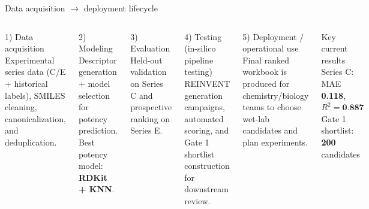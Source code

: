\documentclass[aspectratio=169,10pt]{beamer}
\begin{document}
\begin{frame}{Data acquisition \(\rightarrow\) deployment lifecycle}
  \small
  \begin{columns}[T]
      \begin{block}{1) Data acquisition}
        Experimental series data (C/E + historical labels), SMILES cleaning,
        canonicalization, and deduplication.
      \end{block}
      \begin{block}{2) Modeling}
        Descriptor generation + model selection for potency prediction.
        Best potency model: \textbf{RDKit + KNN}.
      \end{block}
      \begin{block}{3) Evaluation}
        Held-out validation on Series C and prospective ranking on Series E.
      \end{block}
      \begin{block}{4) Testing (in-silico pipeline testing)}
        REINVENT generation campaigns, automated scoring, and
        Gate 1 shortlist construction for downstream review.
      \end{block}
      \begin{block}{5) Deployment / operational use}
        Final ranked workbook is produced for chemistry/biology teams to
        choose wet-lab candidates and plan experiments.
      \end{block}
      \begin{exampleblock}{Key current results}
        Series C: MAE \textbf{0.118}, \(R^2=\textbf{0.887}\)\\
        Gate 1 shortlist: \textbf{200} candidates
      \end{exampleblock}
  \end{columns}
\end{frame}
\end{document}
